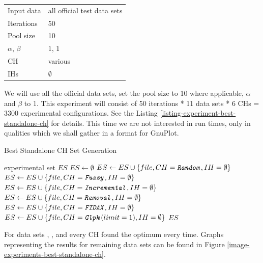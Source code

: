 \begin{center}
\bigskip
\begin{tabular}{| l | l |}
  \hline
  \hline
  Input data        & all official test data sets \\
  Iterations        & 50 \\
  Pool size         & 10 \\
  $\alpha$, $\beta$ & $1$, $1$ \\
  CH                & various \\
  IHs               & $\emptyset$ \\
  \hline
\end{tabular}
\bigskip
\end{center}

We will use all the official data sets, set the pool size to 10 where applicable, $\alpha$ and $\beta$ to 1. This experiment will consist of 50 iterations * 11 data sets * 6 CHs = 3300 experimental configurations. See the Listing \ref{listing-experiment-best-standalone-ch} for details. This time we are not interested in run times, only in qualities which we shall gather in a format for GnuPlot.\\

\begin{algorithm}
\caption{Best Standalone CH Set Generation}
\label{listing-experiment-best-standalone-ch}
\begin{algorithmic}
\ENSURE experimental set $ES$
\STATE $ES \gets \emptyset$
    	\STATE $ES \gets ES \cup \{file, CH = \texttt{\textit{Random}}, IH = \emptyset\}$
    	\STATE $ES \gets ES \cup \{file, CH = \texttt{\textit{Fuzzy}}, IH = \emptyset\}$
    	\STATE $ES \gets ES \cup \{file, CH = \texttt{\textit{Incremental}}, IH = \emptyset\}$
    	\STATE $ES \gets ES \cup \{file, CH = \texttt{\textit{Removal}}, IH = \emptyset\}$
    	\STATE $ES \gets ES \cup \{file, CH = \texttt{\textit{FIDAX}}, IH = \emptyset\}$
    	\STATE $ES \gets ES \cup \{file, CH = \texttt{\textit{Glpk}}(limit = 1), IH = \emptyset\}$
  \ENDFOR
\ENDFOR
\RETURN $ES$
\end{algorithmic}
\end{algorithm}

For data sets , ,  and  every CH found the optimum every time. Graphs representing the results for remaining data sets can be found in Figure \ref{image-experiments-best-standalone-ch}.

